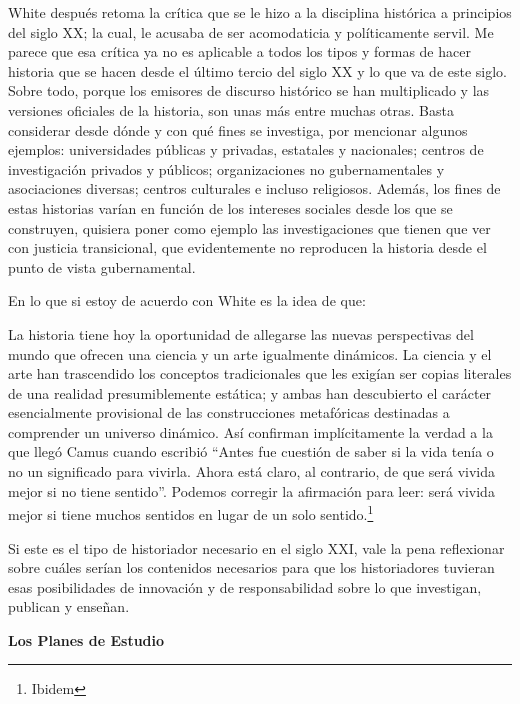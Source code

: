White después retoma la crítica que se le hizo a la disciplina 
histórica a principios del siglo XX; la cual, le acusaba de ser 
acomodaticia y políticamente servil. Me parece que esa crítica ya no es 
aplicable a todos los tipos y formas de hacer historia que se hacen 
desde el último tercio del siglo XX y lo que va de este siglo. Sobre 
todo, porque los emisores de discurso histórico se han multiplicado y 
las versiones oficiales de la historia, son unas más entre muchas 
otras. Basta considerar desde dónde y con qué fines se investiga, por 
mencionar algunos ejemplos: universidades públicas y privadas, 
estatales y nacionales; centros de investigación privados y públicos; 
organizaciones no gubernamentales y asociaciones diversas; centros 
culturales e incluso religiosos. Además, los fines de estas historias 
varían en función de los intereses sociales desde los que se 
construyen, quisiera poner como ejemplo las investigaciones que tienen 
que ver con justicia transicional, que evidentemente no reproducen la 
historia desde el punto de vista gubernamental. 

En lo que si estoy de acuerdo con White es la idea de que:

La historia tiene hoy la oportunidad de allegarse las nuevas 
perspectivas del mundo que ofrecen una ciencia y un arte igualmente 
dinámicos. La ciencia y el arte han trascendido los conceptos 
tradicionales que les exigían ser copias literales de una realidad 
presumiblemente estática; y ambas han descubierto el carácter 
esencialmente provisional de las construcciones metafóricas destinadas 
a comprender un universo dinámico. Así confirman implícitamente la 
verdad a la que llegó Camus cuando escribió “Antes fue cuestión de 
saber si la vida tenía o no un significado para vivirla. Ahora está 
claro, al contrario, de que será vivida mejor si no tiene sentido”. 
Podemos corregir la afirmación para leer: será vivida mejor si tiene 
muchos sentidos en lugar de un solo sentido.\footnote{Ibidem}


\bigskip 
Si este es el tipo de historiador necesario en el siglo XXI, 
vale la pena reflexionar sobre cuáles serían los contenidos necesarios 
para que los historiadores tuvieran esas posibilidades de innovación y 
de responsabilidad sobre lo que investigan, publican y enseñan. 

\textbf{Los Planes de Estudio}

